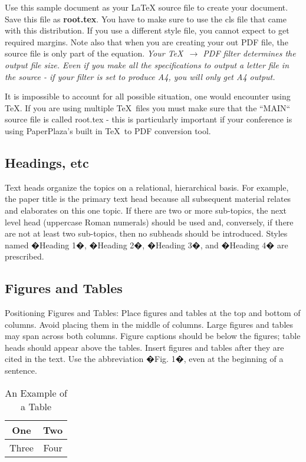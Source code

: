 \documentclass[a4paper, 10pt, conference]{ieeeconf}      %
\begin{document}
Use this sample document as your LaTeX source file to create your document. Save this file as {\bf root.tex}. You have to make sure to use the cls file that came with this distribution. If you use a different style file, you cannot expect to get required margins. Note also that when you are creating your out PDF file, the source file is only part of the equation. {\it Your \TeX\ $\rightarrow$ PDF filter determines the output file size. Even if you make all the specifications to output a letter file in the source - if your filter is set to produce A4, you will only get A4 output. }

It is impossible to account for all possible situation, one would encounter using \TeX. If you are using multiple \TeX\ files you must make sure that the ``MAIN`` source file is called root.tex - this is particularly important if your conference is using PaperPlaza's built in \TeX\ to PDF conversion tool.

\subsection{Headings, etc}

Text heads organize the topics on a relational, hierarchical basis. For example, the paper title is the primary text head because all subsequent material relates and elaborates on this one topic. If there are two or more sub-topics, the next level head (uppercase Roman numerals) should be used and, conversely, if there are not at least two sub-topics, then no subheads should be introduced. Styles named �Heading 1�, �Heading 2�, �Heading 3�, and �Heading 4� are prescribed.

\subsection{Figures and Tables}

Positioning Figures and Tables: Place figures and tables at the top and bottom of columns. Avoid placing them in the middle of columns. Large figures and tables may span across both columns. Figure captions should be below the figures; table heads should appear above the tables. Insert figures and tables after they are cited in the text. Use the abbreviation �Fig. 1�, even at the beginning of a sentence.

\begin{table}[h]
\caption{An Example of a Table}
\label{table_example}
\begin{center}
\begin{tabular}{|c||c|}
\hline
One & Two\\
\hline
Three & Four\\
\hline
\end{tabular}
\end{center}
\end{table}
\end{document}
